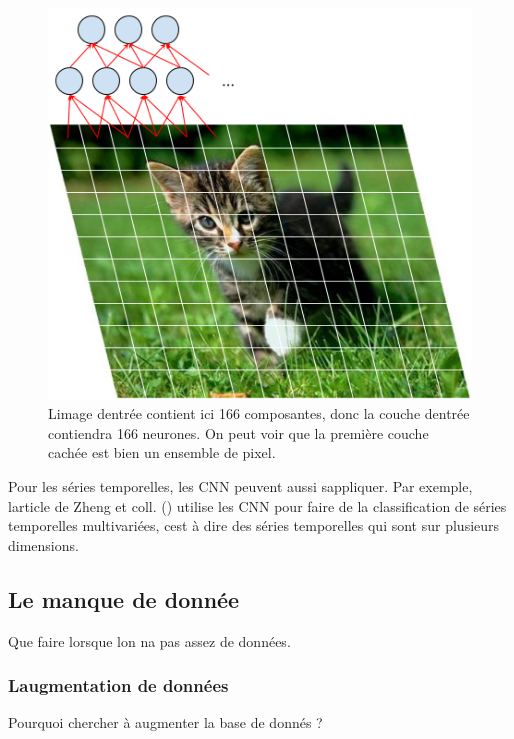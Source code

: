 \documentclass[11pt]{sdm}
\begin{document}
			\begin{figure}[!ht]
				\centering
				\includegraphics[natwidth=474,natheight=504,scale=0.6]{figures/cnnOnImage.png}
				\caption{L\textquotesingle image d\textquotesingle entr\'ee contient ici 166 composantes, donc la couche d\textquotesingle entr\'ee contiendra 166 neurones. On peut voir que la premi\`ere couche cach\'ee est bien un ensemble de pixel.}
				\label{fig:cnnChat}
			\end{figure}

			Pour les s\'eries temporelles, les CNN peuvent aussi s\textquotesingle appliquer. Par exemple, l\textquotesingle article de Zheng et coll. (\cite{zheng2014time}) utilise les CNN pour faire de la classification de s\'eries temporelles multivari\'ees, c\textquotesingle est \`a dire des s\'eries temporelles qui sont sur plusieurs dimensions.

	\subsection{Le manque de donn\'ee}
		Que faire lorsque l\textquotesingle on n\textquotesingle a pas assez de donn\'ees.

		\subsubsection{L\textquotesingle augmentation de donn\'ees}
			\medbreak

			\begin{itshape}{Pourquoi chercher \`a augmenter la base de donn\'es ?}\end{itshape}
\end{document}
